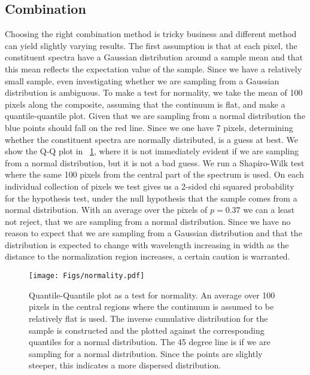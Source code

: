 \documentclass{aa}    %
\newcommand{\figref}[1]{\ref{fig:#1}}
\newcommand{\Fig}[1]{\figurename~\figref{#1}}
\newcommand{\fig}[1]{\Fig{#1}}
\newcommand{\figlabel}[1]{\label{fig:#1}}
\newcommand{\sectlabel}[1]{\label{sect:#1}}
\begin{document}
\subsection{Combination}  \sectlabel{combine}

Choosing the right combination method is tricky business and different method can yield slightly varying results. The first assumption is that at each pixel, the constituent spectra have a Gaussian distribution around a sample mean and that this mean reflects the expectation value of the sample. Since we have a relatively small sample, even investigating whether we are sampling from a Gaussian distribution is ambiguous. To make a test for normality, we take the mean of 100 pixels along the composite, assuming that the continuum is flat, and make a quantile-quantile plot. Given that we are sampling from a normal distribution the blue points should fall on the red line. Since we one have 7 pixels, determining whether the constituent spectra are normally distributed, is a guess at best. We show the Q-Q plot in \fig{normality}, where it is not immediately evident if we are sampling from a normal distribution, but it is not a bad guess. We run a Shapiro-Wilk test where the same 100 pixels from the central part of the spectrum is used. On each individual collection of pixels we test gives us a 2-sided chi squared probability for the hypothesis test, under the null hypothesis that the sample comes from a normal distribution. With an average over the pixels of $p = 0.37$ we can a least not reject, that we are sampling from a normal distribution. Since we have no reason to expect that we are sampling from a Gaussian distribution and that the distribution is expected to change with wavelength increasing in width as the distance to the normalization region increases, a certain caution is warranted. 

\begin{figure}[t!]
  \centering
  \texttt{[image: Figs/normality.pdf]}
  \caption[]{Quantile-Quantile plot as a test for normality. An average over 100 pixels in the central regions where the continuum is assumed to be relatively flat is used. The inverse cumulative distribution for the sample is constructed and the plotted against the corresponding quantiles for a normal distribution. The 45 degree line is if we are sampling for a normal distribution. Since the points are slightly steeper, this indicates a more dispersed distribution.}
 \figlabel{normality}
\end{figure}
\end{document}
